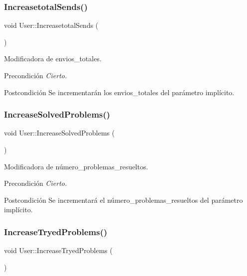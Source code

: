 \subsubsection{\texorpdfstring{Increasetotal\+Sends()}{IncreasetotalSends()}}
{\footnotesize\ttfamily void User\+::\+Increasetotal\+Sends (\begin{DoxyParamCaption}{ }\end{DoxyParamCaption})}



Modificadora de envios\+\_\+totales. 

\begin{DoxyPrecond}{Precondición}
{\itshape Cierto.} 
\end{DoxyPrecond}
\begin{DoxyPostcond}{Postcondición}
Se incrementarán los envios\+\_\+totales del parámetro implícito. 
\end{DoxyPostcond}
\mbox{\label{class_user_a287307b6e024775e5a570949c09d7043}} 
\subsubsection{\texorpdfstring{Increase\+Solved\+Problems()}{IncreaseSolvedProblems()}}
{\footnotesize\ttfamily void User\+::\+Increase\+Solved\+Problems (\begin{DoxyParamCaption}{ }\end{DoxyParamCaption})}



Modificadora de número\+\_\+problemas\+\_\+resueltos. 

\begin{DoxyPrecond}{Precondición}
{\itshape Cierto.} 
\end{DoxyPrecond}
\begin{DoxyPostcond}{Postcondición}
Se incrementará el número\+\_\+problemas\+\_\+resueltos del parámetro implícito. 
\end{DoxyPostcond}
\mbox{\label{class_user_a45407a203e5fcb1be5e1ac9e2ff42faa}} 
\subsubsection{\texorpdfstring{Increase\+Tryed\+Problems()}{IncreaseTryedProblems()}}
{\footnotesize\ttfamily void User\+::\+Increase\+Tryed\+Problems (\begin{DoxyParamCaption}{ }\end{DoxyParamCaption})}



